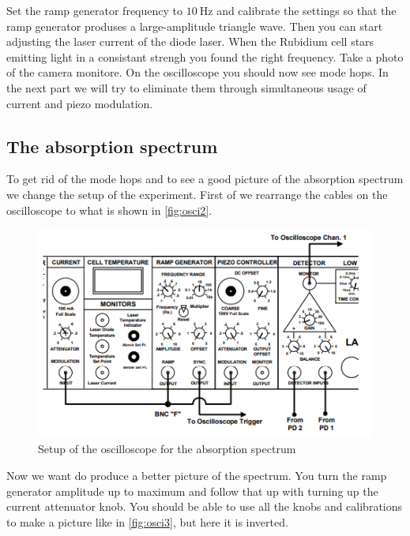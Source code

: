 Set the ramp generator frequency to $\SI{10}{\hertz}$ and calibrate the settings so that the ramp generator produses a large-amplitude triangle wave.
Then you can start adjusting the laser current of the diode laser.
When the Rubidium cell stars emitting light in a consistant strengh you found the right frequency.
Take a photo of the camera monitore.
On the oscilloscope you should now see mode hops.
In the next part we will try to eliminate them through simultaneous usage of current and piezo modulation.

\subsection{The absorption spectrum}
\label{ssec:exe3}

To get rid of the mode hops and to see a good picture of the absorption spectrum we change the setup of the experiment. 
First of we rearrange the cables on the oscilloscope to what is shown in \autoref{fig:osci2}.
\begin{figure}
    \centering
    \includegraphics[width=\textwidth]{images/generator2.png}
    \caption{Setup of the oscilloscope for the absorption spectrum \cite{V60}}
    \label{fig:osci2}
\end{figure}
Now we want do produce a better picture of the spectrum. 
You turn the ramp generator amplitude up to maximum and follow that up with turning up the current attenuator knob.
You should be able to use all the knobs and calibrations to make a picture like in \autoref{fig:osci3}, but here it is inverted.
